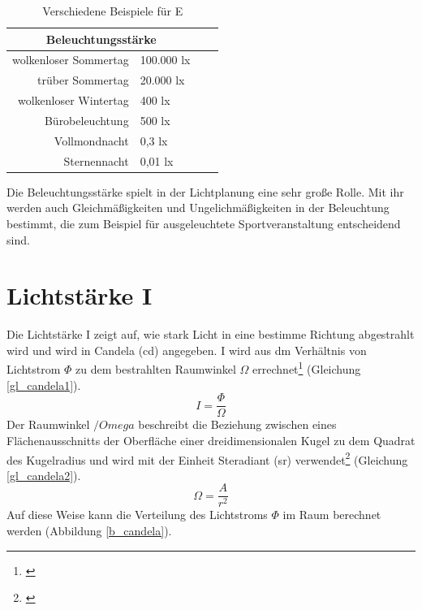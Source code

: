 \begin{table}[htp] 
		\centering
		\begin{tabular}{rlcc}  %
		\toprule
		\multicolumn{2}{c}{\large\sffamily Beleuchtungsstärke}\\ 							
		\midrule
		wolkenloser Sommertag & 100.000 lx\\
		trüber Sommertag & 20.000 lx\\
		wolkenloser Wintertag & 400 lx\\
		Bürobeleuchtung & 500 lx\\
		Vollmondnacht & 0,3 lx\\
		Sternennacht & 0,01 lx\\
		\bottomrule
		\end{tabular}
		\caption{Verschiedene Beispiele für E\protect\footnotemark}	
		\label{t_lux}
	\end{table}
Die Beleuchtungsstärke spielt in der Lichtplanung eine sehr große Rolle. Mit ihr werden auch Gleichmäßigkeiten und Ungelichmäßigkeiten in der Beleuchtung bestimmt, die zum Beispiel für ausgeleuchtete Sportveranstaltung entscheidend sind.

\section{Lichtstärke I}\label{sec_candela}
Die Lichtstärke I zeigt auf, wie stark Licht in eine bestimme Richtung abgestrahlt wird und wird in Candela (cd) angegeben. I wird aus dm Verhältnis von Lichtstrom $\Phi$ zu dem bestrahlten Raumwinkel $\Omega$ errechnet\footnote{\cite[27]{ris}} (Gleichung \ref{gl_candela1}).
 \begin{equation}\label{gl_candela1}
	I=\frac{\Phi}{\Omega}	
\end{equation}
Der Raumwinkel $/Omega$ beschreibt die Beziehung zwischen eines Flächenausschnitts der Oberfläche einer dreidimensionalen Kugel zu dem Quadrat des Kugelradius und wird mit der Einheit Steradiant (sr) verwendet\footnote{\cite[26]{ris}}  (Gleichung \ref{gl_candela2}).
 \begin{equation}\label{gl_candela2}
	\Omega=\frac{A}{r^{2}}	
\end{equation}
Auf diese Weise kann die Verteilung des Lichtstroms $\Phi$ im Raum berechnet werden (Abbildung \ref{b_candela}).

